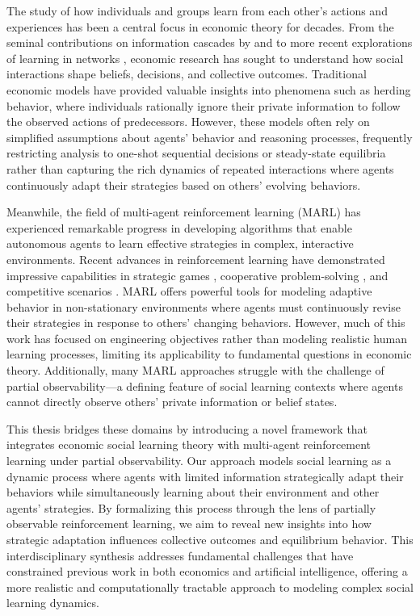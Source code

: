 The study of how individuals and groups learn from each other's actions and experiences has been a central focus in economic theory for decades. From the seminal contributions on information cascades by \citet{banerjee1992simple} and \citet{bikhchandani1992theory} to more recent explorations of learning in networks \citep{acemoglu2011bayesian, golub2010naive}, economic research has sought to understand how social interactions shape beliefs, decisions, and collective outcomes. Traditional economic models have provided valuable insights into phenomena such as herding behavior, where individuals rationally ignore their private information to follow the observed actions of predecessors. However, these models often rely on simplified assumptions about agents' behavior and reasoning processes, frequently restricting analysis to one-shot sequential decisions or steady-state equilibria rather than capturing the rich dynamics of repeated interactions where agents continuously adapt their strategies based on others' evolving behaviors.

Meanwhile, the field of multi-agent reinforcement learning (MARL) has experienced remarkable progress in developing algorithms that enable autonomous agents to learn effective strategies in complex, interactive environments. Recent advances in reinforcement learning have demonstrated impressive capabilities in strategic games \citep{silver2016mastering}, cooperative problem-solving \citep{baker2020emergentreciprocityteamformation}, and competitive scenarios \citep{openai2019dota2largescale}.  MARL offers powerful tools for modeling adaptive behavior in non-stationary environments where agents must continuously revise their strategies in response to others' changing behaviors. However, much of this work has focused on engineering objectives rather than modeling realistic human learning processes, limiting its applicability to fundamental questions in economic theory. Additionally, many MARL approaches struggle with the challenge of partial observability—a defining feature of social learning contexts where agents cannot directly observe others' private information or belief states.

This thesis bridges these domains by introducing a novel framework that integrates economic social learning theory with multi-agent reinforcement learning under partial observability. Our approach models social learning as a dynamic process where agents with limited information strategically adapt their behaviors while simultaneously learning about their environment and other agents' strategies. By formalizing this process through the lens of partially observable reinforcement learning, we aim to reveal new insights into how strategic adaptation influences collective outcomes and equilibrium behavior. This interdisciplinary synthesis addresses fundamental challenges that have constrained previous work in both economics and artificial intelligence, offering a more realistic and computationally tractable approach to modeling complex social learning dynamics.

